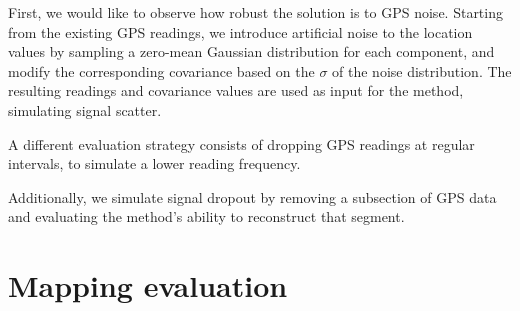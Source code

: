 First, we would like to observe how robust the solution is to GPS noise. Starting from the existing GPS readings, we introduce artificial noise to the location values by sampling a zero-mean Gaussian distribution for each component, and modify the corresponding covariance based on the $\sigma$ of the noise distribution. The resulting readings and covariance values are used as input for the method, simulating signal scatter.


A different evaluation strategy consists of dropping GPS readings at regular intervals, to simulate a lower reading frequency.


Additionally, we simulate signal dropout by removing a subsection of GPS data and evaluating the method's ability to reconstruct that segment.


\section{Mapping evaluation}


